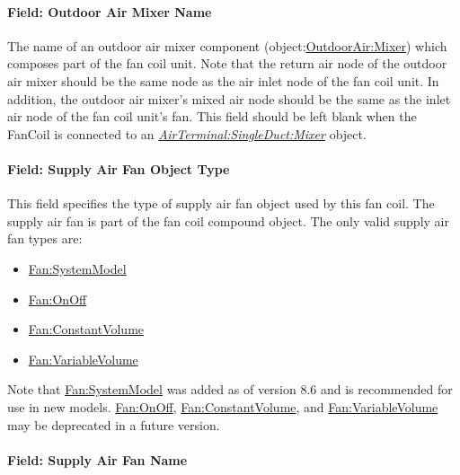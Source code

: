 \paragraph{Field: Outdoor Air Mixer Name}\label{field-outdoor-air-mixer-name-000}

The name of an outdoor air mixer component (object:\hyperref[outdoorairmixer]{OutdoorAir:Mixer}) which composes part of the fan coil unit. Note that the return air node of the outdoor air mixer should be the same node as the air inlet node of the fan coil unit. In addition, the outdoor air mixer's mixed air node should be the same as the inlet air node of the fan coil unit's fan. This field should be left blank when the FanCoil is connected to an \textit{\hyperref[airterminalsingleductmixer]{AirTerminal:SingleDuct:Mixer}} object.

\paragraph{Field: Supply Air Fan Object Type}\label{field-supply-air-fan-object-type-000}

This field specifies the type of supply air fan object used by this fan coil. The supply air fan is part of the fan coil compound object. The only valid supply air fan types are:

\begin{itemize}
\item
  \hyperref[fansystemmodel]{Fan:SystemModel}
\item
  \hyperref[fanonoff]{Fan:OnOff}
\item
  \hyperref[fanconstantvolume]{Fan:ConstantVolume}
\item
  \hyperref[fanvariablevolume]{Fan:VariableVolume}
\end{itemize}

Note that \hyperref[fansystemmodel]{Fan:SystemModel} was added as of version 8.6 and is recommended for use in new models.  \hyperref[fanonoff]{Fan:OnOff}, \hyperref[fanconstantvolume]{Fan:ConstantVolume}, and \hyperref[fanvariablevolume]{Fan:VariableVolume} may be deprecated in a future version.

\paragraph{Field: Supply Air Fan Name}\label{field-supply-air-fan-name-000}

